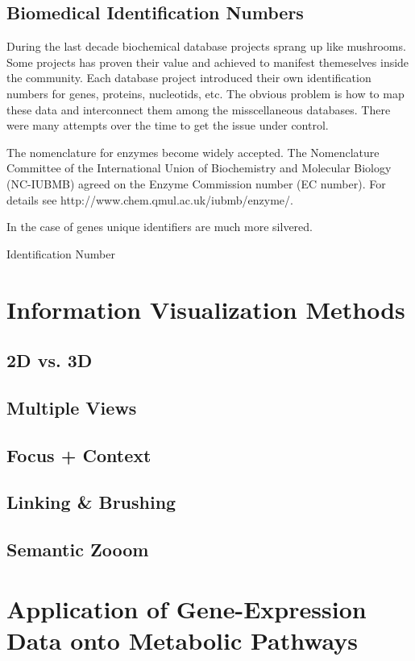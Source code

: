 \subsection{Biomedical Identification Numbers}

During the last decade biochemical database projects sprang up like mushrooms. Some projects has proven their value and achieved to manifest themeselves inside the community. Each database project introduced their own identification numbers for genes, proteins, nucleotids, etc. The obvious problem is how to map these data and interconnect them among the misscellaneous databases. 
There were many attempts over the time to get the issue under control.

The nomenclature for enzymes become widely accepted. The Nomenclature Committee of the International Union of Biochemistry and Molecular Biology (NC-IUBMB) agreed on the Enzyme Commission number (EC number). For details see http://www.chem.qmul.ac.uk/iubmb/enzyme/.

In the case of genes unique identifiers are much more silvered.

Identification Number

\section{Information Visualization Methods}

\subsection{2D vs. 3D}

\subsection{Multiple Views}
\subsection{Focus + Context}
\subsection{Linking \& Brushing}
\subsection{Semantic Zooom}

\section{Application of Gene-Expression Data onto Metabolic Pathways}


